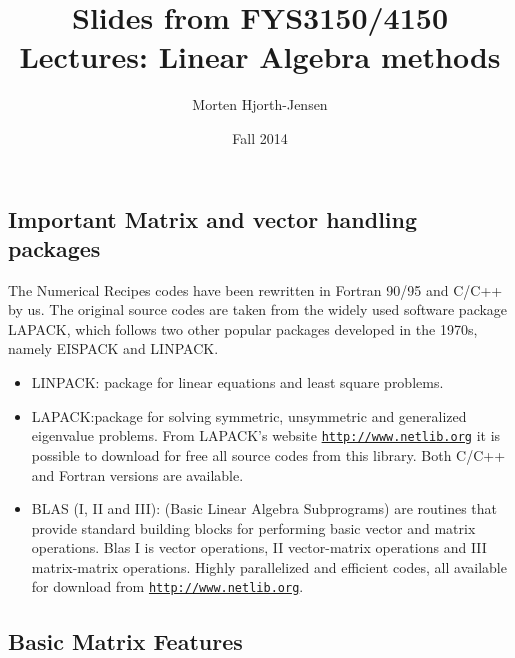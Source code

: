 \documentclass[%
twoside,                 %
final,                   %
10pt]{article}
\begin{document}






\title{Slides from FYS3150/4150 Lectures: Linear Algebra methods}


\author{Morten Hjorth-Jensen}

\date{Fall 2014
}

\subsection{Important Matrix and vector handling packages}

The Numerical Recipes codes have been rewritten in Fortran 90/95 and
C/C++ by us.  The original source codes are taken from the widely used
software package LAPACK, which follows two other popular packages
developed in the 1970s, namely EISPACK and LINPACK.

\begin{itemize}
  \item LINPACK: package for linear equations and least square problems.

  \item LAPACK:package for solving symmetric, unsymmetric and generalized eigenvalue problems. From LAPACK's website \href{{http://www.netlib.org}}{\nolinkurl{http://www.netlib.org}} it is possible to download for free all source codes from this library. Both C/C++ and Fortran versions are available.

  \item BLAS (I, II and III): (Basic Linear Algebra Subprograms) are routines that provide standard building blocks for performing basic vector and matrix operations. Blas I is vector operations, II vector-matrix operations and III matrix-matrix operations. Highly parallelized and efficient codes, all available for download from \href{{http://www.netlib.org}}{\nolinkurl{http://www.netlib.org}}.
\end{itemize}

\noindent
\subsection{Basic Matrix Features}
\end{document}

